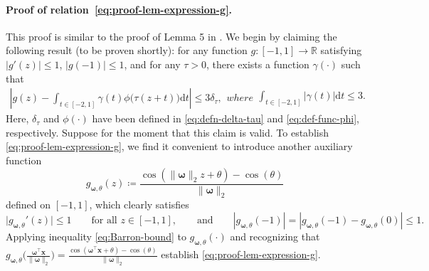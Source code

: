 \documentclass[english]{article}
\begin{document}
\paragraph{Proof of relation~\eqref{eq:proof-lem-expression-g}.}
This proof is similar to the proof of Lemma 5 in \cite{Barron1993Universal}.
We begin by claiming the following result (to be proven shortly):
 for any function $g:[-1,1]\to \mathbb{R}$ satisfying $|g'(z)|\le 1$, $|g(-1)|\le 1$, and for any $\tau >0$,
 there exists a function $\gamma(\cdot)$ such that
 \begin{subequations}
 \label{eq:Barron-bound}
 \begin{align}
 \left|g(z) - \int_{t\in[-2, 1]}\gamma(t)\phi\big(\tau(z + t)\big)\mathrm{d}t\right|\le 3\delta_\tau,
 \end{align}
 where 
 \begin{align}
\int_{t\in[-2, 1]}|\gamma(t)|\mathrm{d} t\le 3.
 \end{align}
 \end{subequations}
 Here, $\delta_\tau$ and 
$\phi(\cdot)$ have been defined in \eqref{eq:defn-delta-tau} and \eqref{eq:def-func-phi}, respectively. 
Suppose for the moment that this claim is valid. 
To establish \eqref{eq:proof-lem-expression-g}, we find it convenient to introduce another auxiliary function 
%
$$g_{\bm{\omega},\theta}(z) \coloneqq  \frac{\cos(\|\bm{\omega}\|_2z + \theta) - \cos(\theta)}{\|\bm{\omega}\|_2}$$
  defined on $[-1,1]$, which clearly satisfies $$
  \big|g_{{\bm \omega},\theta}'(z)\big|\le 1\qquad \text{for all }z\in [-1,1],\qquad \text{and}\qquad |g_{{\bm \omega},\theta}(-1)|= |g_{{\bm \omega},\theta}(-1)-g_{{\bm \omega},\theta}(0)| \le 1.
  $$ 
Applying inequality \eqref{eq:Barron-bound} to 
$g_{{\bm \omega},\theta}(\cdot)$ and recognizing that $g_{{\bm \omega},\theta}\big(\frac{\bm{\omega}^{\top}\bm{x}}{\|\bm{\omega}\|_2}\big)=\frac{\cos(\bm{\omega}^{\top}{\bm x} + \theta) - \cos(\theta)}{\|\bm{\omega}\|_2}$ establish \eqref{eq:proof-lem-expression-g}.
\end{document}
